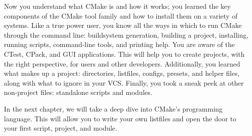 Now you understand what CMake is and how it works; you learned the key components of the CMake tool family and how to install them on a variety of systems. Like a true power user, you know all the ways in which to run CMake through the command line: buildsystem generation, building a project, installing, running scripts, command-line tools, and printing help. You are aware of the CTest, CPack, and GUI applications. This will help you to create projects, with the right perspective, for users and other developers. Additionally, you learned what makes up a project: directories, listfiles, configs, presets, and helper files, along with what to ignore in your VCS. Finally, you took a sneak peek at other non-project files: standalone scripts and modules.

In the next chapter, we will take a deep dive into CMake's programming language. This will allow you to write your own listfiles and open the door to your first script, project, and module.